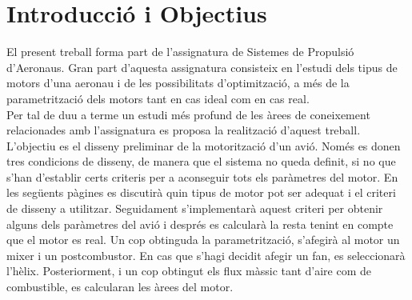 \section{Introducció i Objectius}
El present treball forma part de l'assignatura de Sistemes de Propulsió d'Aeronaus. Gran part d'aquesta assignatura consisteix en l'estudi dels tipus de motors d'una aeronau i de les possibilitats d'optimització, a més de la parametrització dels motors tant en cas ideal com en cas real.\\
Per tal de duu a terme un estudi més profund de les àrees de coneixement relacionades amb l'assignatura es proposa la realització d'aquest treball. L'objectiu es el disseny preliminar de la motorització d'un avió. Només es donen tres condicions de disseny, de manera que el sistema no queda definit, si no que s'han d'establir certs criteris per a aconseguir tots els paràmetres del motor. En les següents pàgines es discutirà quin tipus de motor pot ser adequat i el criteri de disseny a utilitzar. Seguidament s'implementarà aquest criteri per obtenir alguns dels paràmetres del avió i després es calcularà la resta tenint en compte que el motor es real. Un cop obtinguda la parametrització, s'afegirà al motor un mixer i un postcombustor. En cas que s'hagi decidit afegir un fan, es seleccionarà l'hèlix. Posteriorment, i un cop obtingut els flux màssic tant d'aire com de combustible, es calcularan les àrees del motor.